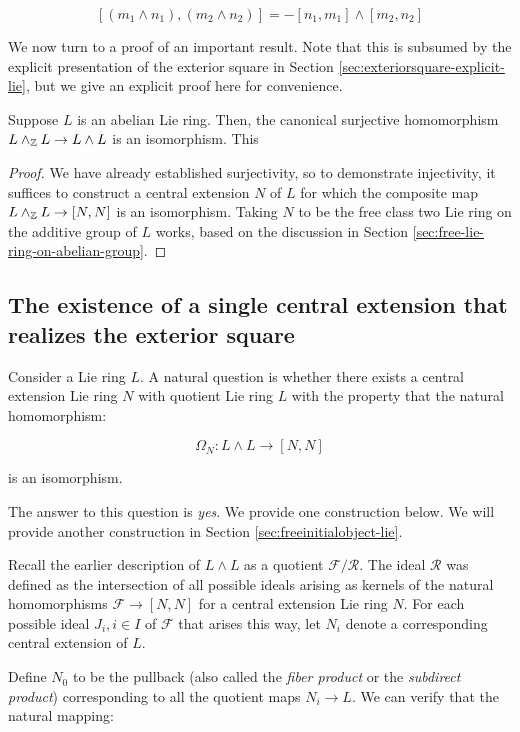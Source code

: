 $$[(m_1 \wedge n_1),(m_2 \wedge n_2)] = -[n_1,m_1] \wedge [m_2,n_2]$$

We now turn to a proof of an important result. Note that this is
subsumed by the explicit presentation of the exterior square in
Section \ref{sec:exteriorsquare-explicit-lie}, but we give an explicit
proof here for convenience.

\begin{lemma}\label{lemma:exteriorsquare-of-abelian-group}
  Suppose $L$ is an abelian Lie ring. Then, the canonical surjective
  homomorphism $L \wedge_{\mathbb{Z}} L \to L \wedge L$ is an isomorphism. This
\end{lemma}

\begin{proof}
  We have already established surjectivity, so to demonstrate
  injectivity, it suffices to construct a central extension $N$ of $L$
  for which the composite map $L \wedge_{\mathbb{Z}} L \to [N,N]$ is an
  isomorphism. Taking $N$ to be the free class two Lie ring on the
  additive group of $L$ works, based on the discussion in Section
  \ref{sec:free-lie-ring-on-abelian-group}.
\end{proof}

\subsection{The existence of a single central extension that realizes the exterior square}\label{sec:grandcentralproduct-lie}

Consider a Lie ring $L$. A natural question is whether there exists a
central extension Lie ring $N$ with quotient Lie ring $L$ with the
property that the natural homomorphism:

$$\Omega_N: L \wedge L \to [N,N]$$

is an isomorphism.

The answer to this question is {\em yes}. We provide one construction
below. We will provide another construction in
Section \ref{sec:freeinitialobject-lie}.

Recall the earlier description of $L \wedge L$ as a quotient
$\mathcal{F}/\mathcal{R}$. The ideal $\mathcal{R}$ was
defined as the intersection of all possible ideals arising
as kernels of the natural homomorphisms $\mathcal{F} \to [N,N]$ for a
central extension Lie ring $N$. For each possible ideal $J_i, i
\in I$ of $\mathcal{F}$ that arises this way, let $N_i$ denote a
corresponding central extension of $L$.

Define $N_0$ to be the pullback (also called the {\em fiber product}
or the {\em subdirect product}) corresponding to all the quotient maps
$N_i \to L$. We can verify that the natural mapping:

